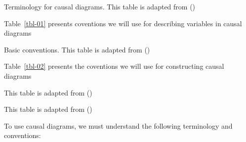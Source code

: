 \documentclass[
  singlecolumn]{article}
\begin{document}
\begin{table}

\caption{\label{tbl-01}Terminology for causal diagrams. This table is
adapted from ()}

\centering{

\terminologylocalconventions

}

\end{table}%

Table~\ref{tbl-01} presents coventions we will use for describing
variables in causal diagrams

\begin{table}

\caption{\label{tbl-02}Basic conventions. This table is adapted from
()}

\centering{

\terminologygeneral

}

\end{table}%

Table~\ref{tbl-02} presents the coventions we will use for constructing
causal diagrams

\begin{table}

\caption{\label{tbl-03}This table is adapted from
()}

\centering{

\terminologydirectedgraph

}

\end{table}%

\begin{table}

\caption{\label{tbl-04}This table is adapted from
()}

\centering{

\terminologyelconfounders

}

\end{table}%

To use causal diagrams, we must understand the following terminology and
conventions:
\end{document}
